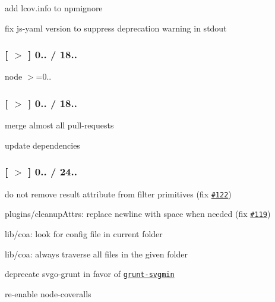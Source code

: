 \begin{DoxyItemize}
\item add {\ttfamily lcov.\+info} to npmignore
\item fix {\ttfamily js-\/yaml} version to suppress deprecation warning in stdout
\end{DoxyItemize}

\subsubsection*{\mbox{[} \href{https://github.com/svg/svgo/tree/v0.4.1}{\tt $>$} \mbox{]} 0.. / 18..}


\begin{DoxyItemize}
\item node $>$=0..
\end{DoxyItemize}

\subsubsection*{\mbox{[} \href{https://github.com/svg/svgo/tree/v0.4.0}{\tt $>$} \mbox{]} 0.. / 18..}


\begin{DoxyItemize}
\item merge almost all pull-\/requests
\item update dependencies
\end{DoxyItemize}

\subsubsection*{\mbox{[} \href{https://github.com/svg/svgo/tree/v0.3.7}{\tt $>$} \mbox{]} 0.. / 24..}


\begin{DoxyItemize}
\item do not remove {\ttfamily result} attribute from filter primitives (fix \href{https://github.com/svg/svgo/issues/122}{\tt \#122})
\item plugins/cleanup\+Attrs\+: replace newline with space when needed (fix \href{https://github.com/svg/svgo/issues/119}{\tt \#119})
\item lib/coa\+: look for config file in current folder
\item lib/coa\+: always traverse all files in the given folder
\item deprecate svgo-\/grunt in favor of \href{https://github.com/sindresorhus/grunt-svgmin}{\tt grunt-\/svgmin}
\item re-\/enable node-\/coveralls
\end{DoxyItemize}

